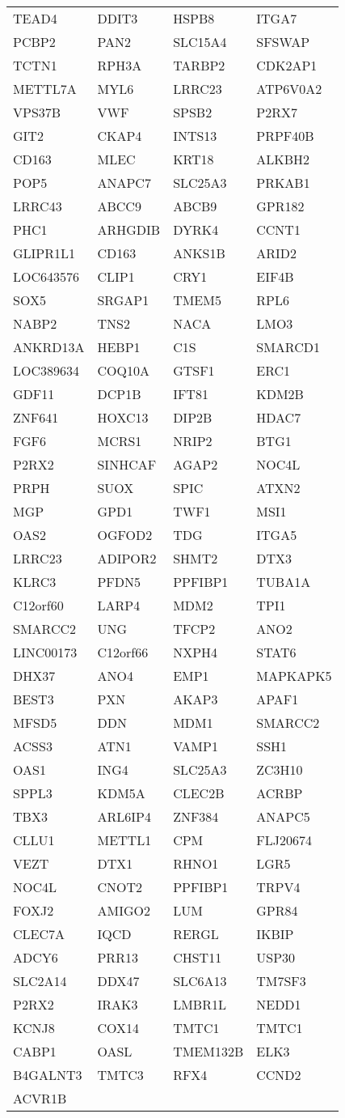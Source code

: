 {\begin{longtable}{llll}
TEAD4&DDIT3&HSPB8&ITGA7\tabularnewline
\newpage
PCBP2&PAN2&SLC15A4&SFSWAP\tabularnewline
TCTN1&RPH3A&TARBP2&CDK2AP1\tabularnewline
METTL7A&MYL6&LRRC23&ATP6V0A2\tabularnewline
VPS37B&VWF&SPSB2&P2RX7\tabularnewline
GIT2&CKAP4&INTS13&PRPF40B\tabularnewline
CD163&MLEC&KRT18&ALKBH2\tabularnewline
POP5&ANAPC7&SLC25A3&PRKAB1\tabularnewline
LRRC43&ABCC9&ABCB9&GPR182\tabularnewline
PHC1&ARHGDIB&DYRK4&CCNT1\tabularnewline
GLIPR1L1&CD163&ANKS1B&ARID2\tabularnewline
LOC643576&CLIP1&CRY1&EIF4B\tabularnewline
SOX5&SRGAP1&TMEM5&RPL6\tabularnewline
NABP2&TNS2&NACA&LMO3\tabularnewline
ANKRD13A&HEBP1&C1S&SMARCD1\tabularnewline
LOC389634&COQ10A&GTSF1&ERC1\tabularnewline
GDF11&DCP1B&IFT81&KDM2B\tabularnewline
ZNF641&HOXC13&DIP2B&HDAC7\tabularnewline
FGF6&MCRS1&NRIP2&BTG1\tabularnewline
P2RX2&SINHCAF&AGAP2&NOC4L\tabularnewline
PRPH&SUOX&SPIC&ATXN2\tabularnewline
MGP&GPD1&TWF1&MSI1\tabularnewline
OAS2&OGFOD2&TDG&ITGA5\tabularnewline
LRRC23&ADIPOR2&SHMT2&DTX3\tabularnewline
KLRC3&PFDN5&PPFIBP1&TUBA1A\tabularnewline
C12orf60&LARP4&MDM2&TPI1\tabularnewline
SMARCC2&UNG&TFCP2&ANO2\tabularnewline
LINC00173&C12orf66&NXPH4&STAT6\tabularnewline
DHX37&ANO4&EMP1&MAPKAPK5\tabularnewline
BEST3&PXN&AKAP3&APAF1\tabularnewline
MFSD5&DDN&MDM1&SMARCC2\tabularnewline
ACSS3&ATN1&VAMP1&SSH1\tabularnewline
OAS1&ING4&SLC25A3&ZC3H10\tabularnewline
SPPL3&KDM5A&CLEC2B&ACRBP\tabularnewline
TBX3&ARL6IP4&ZNF384&ANAPC5\tabularnewline
CLLU1&METTL1&CPM&FLJ20674\tabularnewline
VEZT&DTX1&RHNO1&LGR5\tabularnewline
NOC4L&CNOT2&PPFIBP1&TRPV4\tabularnewline
FOXJ2&AMIGO2&LUM&GPR84\tabularnewline
CLEC7A&IQCD&RERGL&IKBIP\tabularnewline
ADCY6&PRR13&CHST11&USP30\tabularnewline
\newpage
SLC2A14&DDX47&SLC6A13&TM7SF3\tabularnewline
P2RX2&IRAK3&LMBR1L&NEDD1\tabularnewline
KCNJ8&COX14&TMTC1&TMTC1\tabularnewline
CABP1&OASL&TMEM132B&ELK3\tabularnewline
B4GALNT3&TMTC3&RFX4&CCND2\tabularnewline
ACVR1B&&&\tabularnewline
\bottomrule
\end{longtable}}
\addtocounter{table}{-1}
